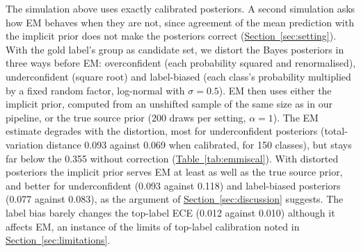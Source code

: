 The simulation above uses exactly calibrated posteriors. A second simulation asks how EM behaves when they are not,
since agreement of the mean prediction with the implicit prior does not make the posteriors correct
(\hyperref[sec:setting]{Section~\ref*{sec:setting}}). With the gold label's group as candidate set, we distort the
Bayes posteriors in three ways before EM: overconfident (each probability squared and renormalised), underconfident
(square root) and label-biased (each class's probability multiplied by a fixed random factor, log-normal with
$\sigma=0.5$). EM then uses either the implicit prior, computed from an unshifted sample of the same size as in our
pipeline, or the true source prior (200 draws per setting, $\alpha=1$). The EM estimate degrades with the distortion,
most for underconfident posteriors (total-variation distance 0.093 against 0.069 when calibrated, for 150 classes),
but stays far below the 0.355 without correction (\hyperref[tab:emmiscal]{Table~\ref*{tab:emmiscal}}). With distorted
posteriors the implicit prior serves EM at least as well as the true source prior, and better for underconfident (0.093
against 0.118) and label-biased posteriors (0.077 against 0.083), as the argument of
\hyperref[sec:discussion]{Section~\ref*{sec:discussion}} suggests. The label bias barely changes the top-label ECE
(0.012 against 0.010) although it affects EM, an instance of the limits of top-label calibration noted in
\hyperref[sec:limitations]{Section~\ref*{sec:limitations}}.

\begin{table}[htbp]
  \centering
  \caption{\textbf{EM's estimate of the target prior degrades as the posteriors are distorted, but stays far better
  than no correction, and the implicit prior serves EM at least as well as the true source prior (exploratory
  simulation).} Gold-group candidate sets; posteriors distorted before EM. ECE: top-label ECE of the distorted
  posteriors on the unshifted sample. Other columns: total-variation distance to the target prior, mean over 200
  draws at $\alpha=1$, of the source prior (no correction) and of the EM estimate with the implicit prior or the true
  source prior.}
  \label{tab:emmiscal}
  \scriptsize
  \setlength{\tabcolsep}{4pt}
  
\end{table}

